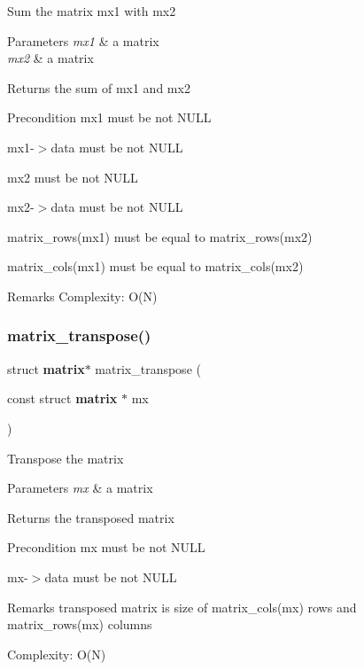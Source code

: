 Sum the matrix {\ttfamily mx1} with {\ttfamily mx2}


\begin{DoxyParams}{Parameters}
{\em mx1} & a matrix \\
\hline
{\em mx2} & a matrix \\
\hline
\end{DoxyParams}
\begin{DoxyReturn}{Returns}
the sum of {\ttfamily mx1} and {\ttfamily mx2}
\end{DoxyReturn}
\begin{DoxyPrecond}{Precondition}
{\ttfamily mx1} must be not N\+U\+LL 

{\ttfamily mx1-\/$>$data} must be not N\+U\+LL 

{\ttfamily mx2} must be not N\+U\+LL 

{\ttfamily mx2-\/$>$data} must be not N\+U\+LL 

{\ttfamily matrix\+\_\+rows(mx1)} must be equal to {\ttfamily matrix\+\_\+rows(mx2)} 

{\ttfamily matrix\+\_\+cols(mx1)} must be equal to {\ttfamily matrix\+\_\+cols(mx2)}
\end{DoxyPrecond}
\begin{DoxyRemark}{Remarks}
Complexity\+: O(\+N) 
\end{DoxyRemark}
\mbox{\label{matrix_8c_af82ecbbd42a059dd5db3d038fd75e9db}} 
\subsubsection{matrix\+\_\+transpose()}
{\footnotesize\ttfamily struct \textbf{ matrix}$\ast$ matrix\+\_\+transpose (\begin{DoxyParamCaption}\item[{const struct \textbf{ matrix} $\ast$}]{mx }\end{DoxyParamCaption})}

Transpose the matrix


\begin{DoxyParams}{Parameters}
{\em mx} & a matrix \\
\hline
\end{DoxyParams}
\begin{DoxyReturn}{Returns}
the transposed matrix
\end{DoxyReturn}
\begin{DoxyPrecond}{Precondition}
{\ttfamily mx} must be not N\+U\+LL 

{\ttfamily mx-\/$>$data} must be not N\+U\+LL
\end{DoxyPrecond}
\begin{DoxyRemark}{Remarks}
transposed matrix is size of {\ttfamily matrix\+\_\+cols(mx)} rows and {\ttfamily matrix\+\_\+rows(mx)} columns 

Complexity\+: O(\+N) 
\end{DoxyRemark}
